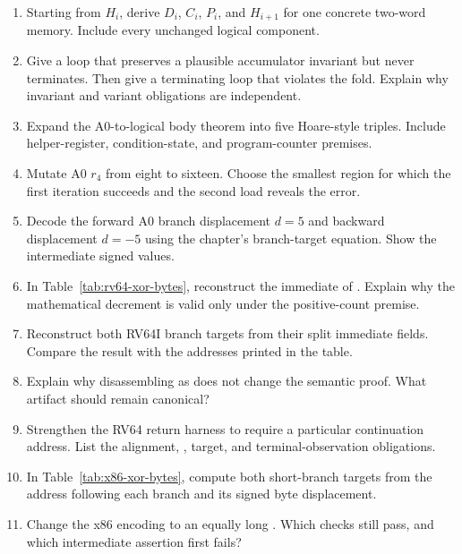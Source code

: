 \begin{enumerate}
\item Starting from \(H_i\), derive \(D_i\), \(C_i\), \(P_i\), and
\(H_{i+1}\) for one concrete two-word memory. Include every unchanged logical
component.

\item Give a loop that preserves a plausible accumulator invariant but never
terminates. Then give a terminating loop that violates the fold. Explain why
invariant and variant obligations are independent.

\item Expand the A0-to-logical body theorem into five Hoare-style triples.
Include helper-register, condition-state, and program-counter premises.

\item Mutate A0 \(r_4\) from eight to sixteen. Choose the smallest region for
which the first iteration succeeds and the second load reveals the error.

\item Decode the forward A0 branch displacement \(d=5\) and backward
displacement \(d=-5\) using the chapter's branch-target equation. Show the
intermediate signed values.

\item In Table~\ref{tab:rv64-xor-bytes}, reconstruct the immediate of
. Explain why the mathematical decrement is valid only
under the positive-count premise.

\item Reconstruct both RV64I branch targets from their split immediate fields.
Compare the result with the addresses printed in the table.

\item Explain why disassembling  as  does
not change the semantic proof. What artifact should remain canonical?

\item Strengthen the RV64 return harness to require a particular continuation
address. List the alignment, , target, and terminal-observation
obligations.

\item In Table~\ref{tab:x86-xor-bytes}, compute both short-branch targets from
the address following each branch and its signed byte displacement.

\item Change the x86  encoding to an equally long
. Which checks still pass, and which intermediate assertion
first fails?


\end{enumerate}
